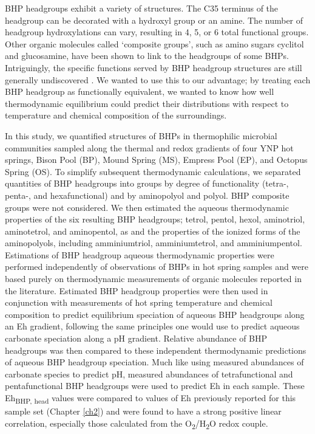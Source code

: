BHP headgroups exhibit a variety of structures. The C35 terminus of the headgroup can be decorated with a hydroxyl group or an amine. The number of headgroup hydroxylations can vary, resulting in 4, 5, or 6 total functional groups. Other organic molecules called `composite groups', such as amino sugars cyclitol and glucosamine, have been shown to link to the headgroups of some BHPs. Intriguingly, the specific functions served by BHP headgroup structures are still generally undiscovered \cite{belin2018hopanoid}. We wanted to use this to our advantage; by treating each BHP headgroup as functionally equivalent, we wanted to know how well thermodynamic equilibrium could predict their distributions with respect to temperature and chemical composition of the surroundings.

In this study, we quantified structures of BHPs in thermophilic microbial communities sampled along the thermal and redox gradients of four YNP hot springs, Bison Pool (BP), Mound Spring (MS), Empress Pool (EP), and Octopus Spring (OS). To simplify subsequent thermodynamic calculations, we separated quantities of BHP headgroups into groups by degree of functionality (tetra-, penta-, and hexafunctional) and by aminopolyol and polyol. BHP composite groups were not considered. We then estimated the aqueous thermodynamic properties of the six resulting BHP headgroups; tetrol, pentol, hexol, aminotriol, aminotetrol, and aminopentol, as and the properties of the ionized forms of the aminopolyols, including amminiumtriol, amminiumtetrol, and amminiumpentol. Estimations of BHP headgroup aqueous thermodynamic properties were performed independently of observations of BHPs in hot spring samples and were based purely on thermodynamic measurements of organic molecules reported in the literature. Estimated BHP headgroup properties were then used in conjunction with measurements of hot spring temperature and chemical composition to predict equilibrium speciation of aqueous BHP headgroups along an Eh gradient, following the same principles one would use to predict aqueous carbonate speciation along a pH gradient. Relative abundance of BHP headgroups was then compared to these independent thermodynamic predictions of aqueous BHP headgroup speciation. Much like using measured abundances of carbonate species to predict pH, measured abundances of tetrafunctional and pentafunctional BHP headgroups were used to predict Eh in each sample. These Eh\textsubscript{BHP, head} values were compared to values of Eh previously reported for this sample set (Chapter \ref{ch2}) and were found to have a strong positive linear correlation, especially those calculated from the O\textsubscript{2}/H\textsubscript{2}O redox couple.

